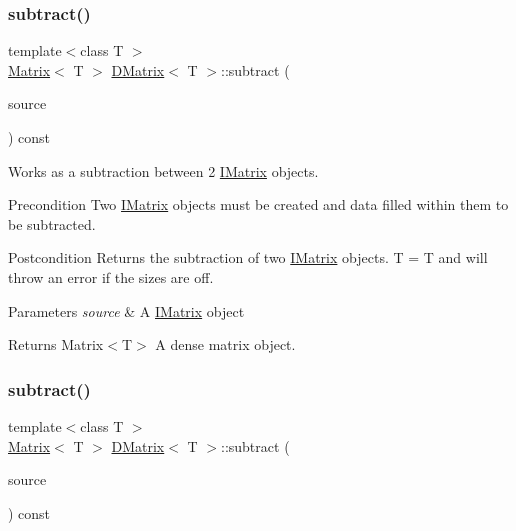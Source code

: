 \subsubsection{\texorpdfstring{subtract()}{subtract()}\hspace{0.1cm}{\footnotesize\ttfamily [1/6]}}
{\footnotesize\ttfamily template$<$class T $>$ \\
\mbox{\hyperlink{class_matrix}{Matrix}}$<$ T $>$ \mbox{\hyperlink{class_d_matrix}{D\+Matrix}}$<$ T $>$\+::subtract (\begin{DoxyParamCaption}\item[{const \mbox{\hyperlink{class_i_matrix}{I\+Matrix}}$<$ \mbox{\hyperlink{class_matrix}{Matrix}}$<$ T $>$, T $>$ \&}]{source }\end{DoxyParamCaption}) const}



Works as a subtraction between 2 \mbox{\hyperlink{class_i_matrix}{I\+Matrix}} objects. 

\begin{DoxyPrecond}{Precondition}
Two \mbox{\hyperlink{class_i_matrix}{I\+Matrix}} objects must be created and data filled within them to be subtracted. 
\end{DoxyPrecond}
\begin{DoxyPostcond}{Postcondition}
Returns the subtraction of two \mbox{\hyperlink{class_i_matrix}{I\+Matrix}} objects. T = T and will throw an error if the sizes are off.
\end{DoxyPostcond}

\begin{DoxyParams}{Parameters}
{\em source} & A \mbox{\hyperlink{class_i_matrix}{I\+Matrix}} object \\
\hline
\end{DoxyParams}
\begin{DoxyReturn}{Returns}
Matrix$<$\+T$>$ A dense matrix object. 
\end{DoxyReturn}
\mbox{\label{class_d_matrix_a7d90783b21941d4abd0898867b337c5f}} 
\subsubsection{\texorpdfstring{subtract()}{subtract()}\hspace{0.1cm}{\footnotesize\ttfamily [2/6]}}
{\footnotesize\ttfamily template$<$class T $>$ \\
\mbox{\hyperlink{class_matrix}{Matrix}}$<$ T $>$ \mbox{\hyperlink{class_d_matrix}{D\+Matrix}}$<$ T $>$\+::subtract (\begin{DoxyParamCaption}\item[{const \mbox{\hyperlink{class_i_matrix}{I\+Matrix}}$<$ \mbox{\hyperlink{class_t_matrix}{T\+Matrix}}$<$ T $>$, T $>$ \&}]{source }\end{DoxyParamCaption}) const}



